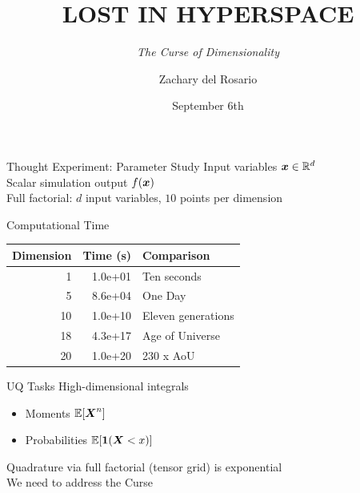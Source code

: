 \documentclass[14pt]{beamer}
\title{LOST IN HYPERSPACE}
\subtitle{\emph{The Curse of Dimensionality}}
\author{Zachary del Rosario}
\institute{zdr@stanford.edu}
\date{September 6th}
\begin{document}
\begin{frame}[plain]
\maketitle
\end{frame}

\begin{frame}[t]{Thought Experiment: Parameter Study}
  Input variables $\boldsymbol{x}\in\mathbb{R}^{d}$ \\
  Scalar simulation output $f(\boldsymbol{x})$ \\
  Full factorial: $d$ input variables, $10$ points per dimension \\

  \bigskip
\end{frame}

\begin{frame}{Computational Time}
  \begin{table}
    \begin{tabular}{r|r|l}
    \hline
    Dimension & Time (s) & Comparison\\
    \hline
    1 & 1.0e+01 & Ten seconds\\
    \hline
    5 & 8.6e+04 & One Day\\
    \hline
    10 & 1.0e+10 & Eleven generations\\
    \hline
    18 & 4.3e+17 & Age of Universe\\
    \hline
    20 & 1.0e+20 & 230 x AoU\\
    \hline
    \end{tabular}
  \end{table}
\end{frame}

\begin{frame}{UQ Tasks}
  High-dimensional integrals
  \begin{itemize}
  \item Moments $\mathbb{E}[\boldsymbol{X}^n]$
  \item Probabilities $\E[\i1(\mX<x)]$
  \end{itemize}

  \bigskip Quadrature via full factorial (tensor grid) is exponential \\
  We need to address the Curse
\end{frame}
\end{document}
